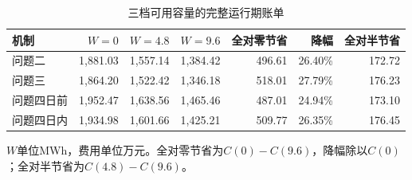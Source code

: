 \begin{table}[H]\centering\small
\caption{三档可用容量的完整运行期账单}\label{tab:capacitycost}
\begin{tabular}{lrrrrrr}\toprule
机制& $W=0$ & $W=4.8$ & $W=9.6$ & 全对零节省 & 降幅 & 全对半节省\\\midrule
问题二&1,881.03&1,557.14&1,384.42&496.61&26.40\%&172.72\\
问题三&1,864.20&1,522.42&1,346.18&518.01&27.79\%&176.23\\
问题四日前&1,952.47&1,638.56&1,465.46&487.01&24.94\%&173.10\\
问题四日内&1,934.98&1,601.66&1,425.21&509.77&26.35\%&176.45\\
\bottomrule\end{tabular}
\par\footnotesize $W$单位MWh，费用单位万元。全对零节省为$C(0)-C(9.6)$，降幅除以$C(0)$；全对半节省为$C(4.8)-C(9.6)$。
\end{table}
